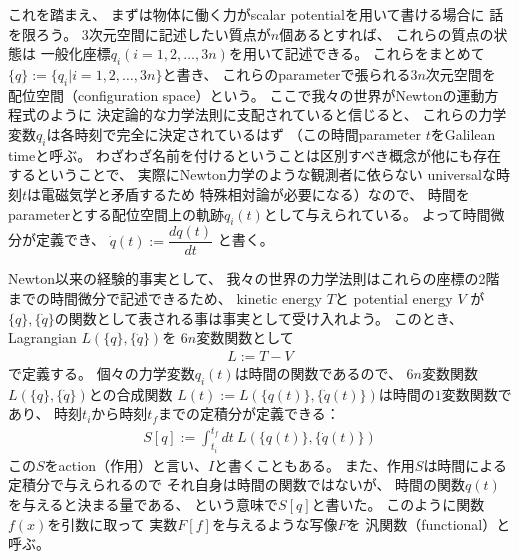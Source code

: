 これを踏まえ、
まずは物体に働く力がscalar potentialを用いて書ける場合に
話を限ろう。
3次元空間に記述したい質点が$n$個あるとすれば、
これらの質点の状態は
一般化座標$q_i$$(i=1,2,\dots,3n)$を用いて記述できる。
これらをまとめて$\{q\} := \{q_i| i=1,2,\dots,3n\}$と書き、
これらのparameterで張られる$3n$次元空間を
配位空間（configuration space）という。
ここで我々の世界がNewtonの運動方程式のように
決定論的な力学法則に支配されていると信じると、
これらの力学変数$q_i$は各時刻で完全に決定されているはず
（この時間parameter $t$をGalilean timeと呼ぶ。
わざわざ名前を付けるということは区別すべき概念が他にも存在するということで、
実際にNewton力学のような観測者に依らない
universalな時刻$t$は電磁気学と矛盾するため
特殊相対論が必要になる）なので、
時間をparameterとする配位空間上の軌跡$q_i(t)$として与えられている。
よって時間微分が定義でき、
$\dot{q}(t) := \dfrac{dq(t)}{dt}$
と書く。

Newton以来の経験的事実として、
我々の世界の力学法則はこれらの座標の2階までの時間微分で記述できるため、
kinetic energy $T$と
potential energy $V$
が
$\{q\}, \{\dot{q}\}$の関数として表される事は事実として受け入れよう。
このとき、Lagrangian $L(\{q\}, \{\dot{q}\})$を
$6n$変数関数として
\begin{align}
  L := T - V
\end{align}
で定義する。
個々の力学変数$q_i(t)$は時間の関数であるので、
$6n$変数関数
$L(\{q\}, \{\dot{q}\})$との合成関数
$L(t) := L(\{q(t)\}, \{\dot{q}(t)\})$は時間の$1$変数関数であり、
時刻$t_i$から時刻$t_f$までの定積分が定義できる：
\begin{align}
  S[q] := \int_{t_i}^{t_f}dt\ L(\{q(t)\}, \{\dot{q}(t)\})
\end{align}
この$S$をaction（作用）と言い、$I$と書くこともある。
また、作用$S$は時間による定積分で与えられるので
それ自身は時間の関数ではないが、
時間の関数$q(t)$を与えると決まる量である、
という意味で$S[q]$と書いた。
このように関数$f(x)$を引数に取って
実数$F[f]$を与えるような写像$F$を
汎関数（functional）と呼ぶ。

